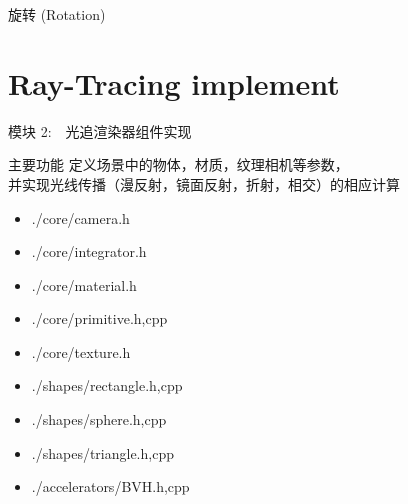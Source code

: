 \documentclass{beamer}
\begin{document}
\begin{frame} {旋转 (Rotation)}
\begin{itemize}
\end{itemize}
\end{frame}

\section{Ray-Tracing implement}
\begin{frame} {模块 2:　光追渲染器组件实现}
\begin{block}{主要功能}
    定义场景中的物体，材质，纹理相机等参数，\\ 并实现光线传播（漫反射，镜面反射，折射，相交）的相应计算
  \end{block}
\begin{itemize}
			\item \begin{semiverbatim}
    ./core/camera.h
  \end{semiverbatim}
			\item \begin{semiverbatim}
    ./core/integrator.h
  \end{semiverbatim}
			\item \begin{semiverbatim}
    ./core/material.h
  \end{semiverbatim}
\item \begin{semiverbatim}
    ./core/primitive.h,cpp
  \end{semiverbatim}
\item \begin{semiverbatim}
    ./core/texture.h
  \end{semiverbatim}
\item \begin{semiverbatim}
    ./shapes/rectangle.h,cpp
  \end{semiverbatim}
\item \begin{semiverbatim}
    ./shapes/sphere.h,cpp
  \end{semiverbatim}
\item \begin{semiverbatim}
     ./shapes/triangle.h,cpp
  \end{semiverbatim}
\item \begin{semiverbatim}
    ./accelerators/BVH.h,cpp
  \end{semiverbatim}
\end{itemize}
\end{frame}
\end{document}
